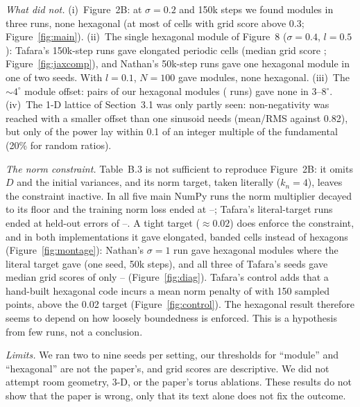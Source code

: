\documentclass[10pt,letterpaper]{article}
\begin{document}
\emph{What did not.} (i)~Figure~2B: at $\sigma=0.2$ and 150k steps we found \xMainLowTotalModules{} modules in three runs, none hexagonal (at most \xMainLowGridMax{} of cells with grid score above 0.3; Figure~\ref{fig:main}). (ii)~The single hexagonal module of Figure~8 ($\sigma=0.4$, $l=0.5$): Tafara's 150k-step runs gave elongated periodic cells (median grid score \jRefHalfScore; Figure~\ref{fig:jaxcomp}), and Nathan's 50k-step runs gave one hexagonal module in one of two seeds. With $l=0.1$, $N=100$ gave \xLtenModulesH{} modules, none hexagonal. (iii)~The $\sim4^\circ$ module offset: \angleMeasPairs{} pairs of our hexagonal modules (\angleMeasRuns{} runs) gave none in 3--8$^\circ$. (iv)~The 1-D lattice of Section~3.1 was only partly seen: non-negativity was reached with a smaller offset than one sinusoid needs (mean/RMS \oneDMeanRms{} against 0.82), but only \oneDShare{} of the power lay within 0.1 of an integer multiple of the fundamental (20\% for random ratios).

\emph{The norm constraint.} Table~B.3 is not sufficient to reproduce Figure~2B: it omits $D$ and the initial variances, and its norm target, taken literally ($k_n=4$), leaves the constraint inactive. In all five main NumPy runs the norm multiplier decayed to its floor and the training norm loss ended at \xLbMainMin--\xLbMainMax{}; Tafara's literal-target runs ended at held-out errors of \jDiagTabNormLo--\jDiagTabNormHi. A tight target ($\approx0.02$) does enforce the constraint, and in both implementations it gave elongated, banded cells instead of hexagons (Figure~\ref{fig:montage}): Nathan's $\sigma=1$ run gave \xTightOneHex{} hexagonal modules where the literal target gave \xLooseOneHex{} (one seed, 50k steps), and all three of Tafara's seeds gave median grid scores of only \jDiagBaseScoreLo--\jDiagBaseScoreHi{} (Figure~\ref{fig:diag}). Tafara's control adds that a hand-built hexagonal code incurs a mean norm penalty of \jCtlOneFifty{} with 150 sampled points, above the 0.02 target (Figure~\ref{fig:control}). The hexagonal result therefore seems to depend on how loosely boundedness is enforced. This is a hypothesis from few runs, not a conclusion.

\emph{Limits.} We ran two to nine seeds per setting, our thresholds for ``module'' and ``hexagonal'' are not the paper's, and grid scores are descriptive. We did not attempt room geometry, 3-D, or the paper's torus ablations. These results do not show that the paper is wrong, only that its text alone does not fix the outcome.
\end{document}
